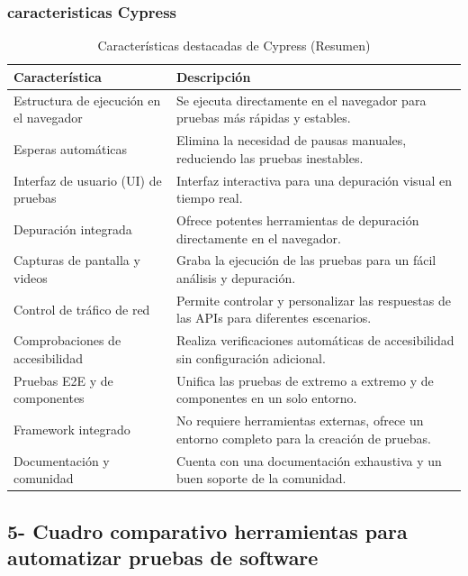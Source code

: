 \documentclass[man, floatsintext]{apa7}
\begin{document}
	\subsubsection{caracteristicas Cypress}
	\begin{table}[h!]
		\centering
		\begin{tabular}{|p{4cm}|p{10cm}|}
			\hline
			\textbf{Característica} & \textbf{Descripción} \\
			\hline
			Estructura de ejecución en el navegador & Se ejecuta directamente en el navegador para pruebas más rápidas y estables. \\
			\hline
			Esperas automáticas & Elimina la necesidad de pausas manuales, reduciendo las pruebas inestables. \\
			\hline
			Interfaz de usuario (UI) de pruebas & Interfaz interactiva para una depuración visual en tiempo real. \\
			\hline
			Depuración integrada & Ofrece potentes herramientas de depuración directamente en el navegador. \\
			\hline
			Capturas de pantalla y videos & Graba la ejecución de las pruebas para un fácil análisis y depuración. \\
			\hline
			Control de tráfico de red & Permite controlar y personalizar las respuestas de las APIs para diferentes escenarios. \\
			\hline
			Comprobaciones de accesibilidad & Realiza verificaciones automáticas de accesibilidad sin configuración adicional. \\
			\hline
			Pruebas E2E y de componentes & Unifica las pruebas de extremo a extremo y de componentes en un solo entorno. \\
			\hline
			Framework integrado & No requiere herramientas externas, ofrece un entorno completo para la creación de pruebas. \\
			\hline
			Documentación y comunidad & Cuenta con una documentación exhaustiva y un buen soporte de la comunidad. \\
			\hline
		\end{tabular}
		\caption{Características destacadas de Cypress (Resumen) \cite{keepcoding_cypress}}
		\label{tab:cypress_features_summary}
	\end{table}
	\FloatBarrier
	
	\subsection{5- Cuadro comparativo herramientas para automatizar pruebas de software}
	
\end{document}
